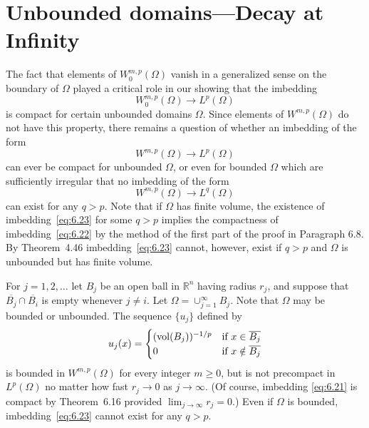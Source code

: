 \section{Unbounded domains---Decay at Infinity}

\begin{para}
  The fact that elements of $W_0^{m,p}(\Omega)$ vanish in a generalized sense on the
  boundary of $\Omega$ played a critical role in our showing that the imbedding
  \begin{equation}\label{eq:6.21}
    W_0^{m,p}(\Omega) \to L^p(\Omega)
  \end{equation}
  is compact for certain unbounded domains $\Omega$. Since elements
  of $W^{m,p}(\Omega)$ do not have this property, there remains a question of whether
  an imbedding of the form
  \begin{equation}\label{eq:6.22}
    W^{m,p}(\Omega) \to L^p(\Omega)
  \end{equation}
  can ever be compact for unbounded $\Omega$, or even for bounded $\Omega$ which are
  sufficiently irregular that no imbedding of the form
  \begin{equation}\label{eq:6.23}
    W^{m,p}(\Omega) \to L^q(\Omega)
  \end{equation}
  can exist for any $q>p$. Note that if $\Omega$ has finite volume, the existence
  of imbedding~\eqref{eq:6.23} for some $q>p$ implies the compactness of imbedding~\eqref{eq:6.22}
  by the method of the first part of the proof in Paragraph 6.8.
  By Theorem~4.46 imbedding~\eqref{eq:6.23} cannot, however, exist if $q>p$ and $\Omega$
  is unbounded but has finite volume.
\end{para}


\begin{example}
  For $j=1,2,\dots$ let $B_j$ be an open ball in $\mathbb{R}^n$ having radius
  $r_j$, and suppose that $\overline{B_j}\cap\overline{B_i}$ is empty whenever
  $j\neq i$. Let $\Omega = \cup_{j=1}^\infty B_j$. Note that $\Omega$ may be
  bounded or unbounded. The sequence $\{u_j\}$ defined by
  \[ u_j(x) = \begin{cases}
    (\operatorname{vol}(B_j))^{-1/p} & \text{if}\ x\in\overline{B_j} \\
    0                  & \text{if}\ x\notin\overline{B_j}
  \end{cases}\]
  is bounded in $W^{m,p}(\Omega)$ for every integer $m\geq 0$, but is not
  precompact in $L^p(\Omega)$ no matter how fast $r_j\to 0$ as $j\to\infty$.
  (Of course, imbedding \eqref{eq:6.21} is compact by Theorem~6.16 provided
  $\lim_{j\to\infty} r_j = 0$.) Even if $\Omega$ is bounded, imbedding~\eqref{eq:6.23}
  cannot exist for any $q>p$.
\end{example}


